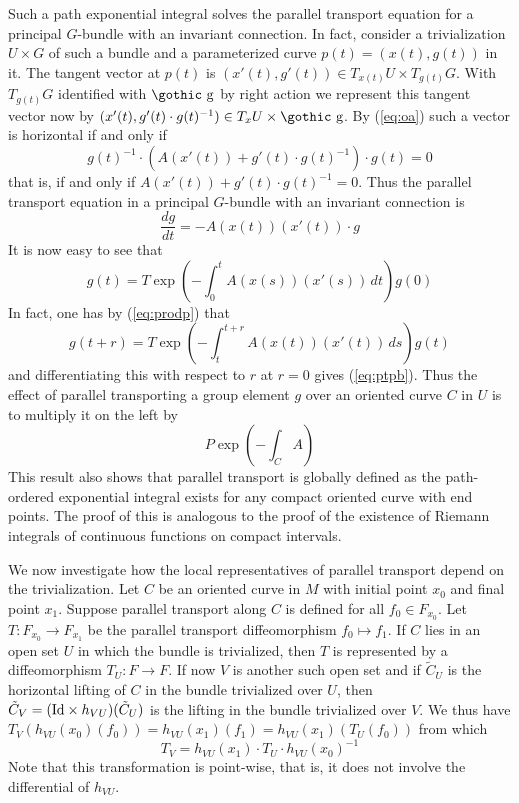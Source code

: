 \documentclass[12pt,titlepage]{article}
\def\goth#1{\hbox{\gothic #1}}
\def\gg{{\goth g}}
\def\Id{\hbox{Id}}
\begin{document}
Such a path  exponential
integral solves the parallel transport equation for a principal
\(G\)-bundle with an invariant connection. In fact, consider a 
trivialization \(U\times G\)
of such a bundle
and a parameterized curve \(p(t)=(x(t), g(t))\) in  it. The tangent
vector at \(p(t)\) is
\((x'(t),g'(t))\in T_{x(t)}U\times T_{g(t)}G\).  With \(T_{g(t)}G\)
identified with \(\gg\) by right action we represent this tangent vector
now by \((x'(t), g'(t)\cdot g(t)^{-1})\in T_xU\times\gg\).  By
(\ref{eq:oa}) such a vector is horizontal if and only if
\[
g(t)^{-1}\cdot(A (x'(t)) + g'(t)\cdot g(t)^{-1})\cdot g(t)
=0
\]
 that is,  if and only if \(A (x'(t)) + g'(t)\cdot g(t)^{-1}
= 0\). Thus the parallel transport equation in a principal \(G\)-bundle
with an invariant connection is
\begin{equation}\label{eq:ptpb}%
\frac{dg}{dt} = -A(x(t))(x'(t))\cdot g
\end{equation}%
It is now easy to see that
\[
g(t) = T \exp \left(-\int_0^t A (x(s))(x'(s))\,dt\right)g(0)
\]
In fact, one has by
(\ref{eq:prodp}) that
\[
g(t+r) =  T\exp\left( -\int_t^{t+r}A (x(t))(x'(t))\,ds\right)g(t)
\]
and differentiating this with respect to \(r\) at \(r=0\) gives
(\ref{eq:ptpb}).
Thus the effect of parallel transporting a group element \(g\) over an
oriented curve \(C\) in \(U\) is to multiply it on the left by
\[
P\exp\left(-\int_C A \right)
\]
This result also shows that parallel transport is globally defined
as the path-ordered exponential integral exists for any compact
oriented curve with end points. The proof of this is analogous to the
proof of the existence of Riemann integrals of continuous functions on
compact intervals.

We now investigate how the local representatives of parallel transport
depend on the trivialization. Let \(C\) be an oriented curve in \(M\)
with initial point \(x_0\) and final point \(x_1\). Suppose parallel
transport along \(C\) is defined for all \(f_0\in F_{x_0}\). Let
\(T:F_{x_0}\to F_{x_1}\) be the parallel transport diffeomorphism \(f_0
\mapsto f_1\). If \(C\) lies in an open set \(U\) in which the bundle is
trivialized, then \(T\) is represented by a diffeomorphism \(T_U:F\to
F\). If now \(V\) is another such open set and if \(\tilde C_U\) is the
horizontal lifting of \(C\) in the bundle trivialized over \(U\), then
\(\tilde C_V =(\Id\times h_{VU})(\tilde C_U)\) is the lifting in the
bundle trivialized over \(V\). We thus have 
\(T_V(h_{VU}(x_0)(f_0)) = h_{VU}(x_1)(f_1)=h_{VU}(x_1)(T_U(f_0))\) from
which 
\begin{equation}\label{eq:pti}
T_V = h_{VU}(x_1)\cdot T_U\cdot h_{VU}(x_0)^{-1}
\end{equation} 
Note that this transformation is point-wise, that is, it does not involve
the differential of \(h_{VU}\).
\end{document}
